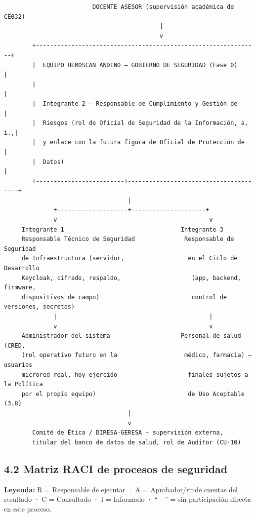 \documentclass[11pt,a4paper]{article}
\begin{document}
\begin{samepage}\begin{verbatim}
                         DOCENTE ASESOR (supervisión académica de CE032)
                                            |
                                            v
        +---------------------------------------------------------------+
        |  EQUIPO HEMOSCAN ANDINO — GOBIERNO DE SEGURIDAD (Fase 0)        |
        |                                                                 |
        |  Integrante 2 — Responsable de Cumplimiento y Gestión de        |
        |  Riesgos (rol de Oficial de Seguridad de la Información, a. i.,|
        |  y enlace con la futura figura de Oficial de Protección de     |
        |  Datos)                                                        |
        +-------------------------+---------------------------------------+
                                   |
              +--------------------+---------------------+
              v                                           v
     Integrante 1                                 Integrante 3
     Responsable Técnico de Seguridad              Responsable de Seguridad
     de Infraestructura (servidor,                  en el Ciclo de Desarrollo
     Keycloak, cifrado, respaldo,                    (app, backend, firmware,
     dispositivos de campo)                          control de versiones, secretos)
              |                                           |
              v                                           v
     Administrador del sistema                    Personal de salud (CRED,
     (rol operativo futuro en la                   médico, farmacia) — usuarios
     microred real, hoy ejercido                    finales sujetos a la Política
     por el propio equipo)                          de Uso Aceptable (3.8)
                                   |
                                   v
        Comité de Ética / DIRESA-GERESA — supervisión externa,
        titular del banco de datos de salud, rol de Auditor (CU-10)
\end{verbatim}\end{samepage}

\subsection{4.2 Matriz RACI de procesos de seguridad}\label{matriz-raci-de-procesos-de-seguridad}

\textbf{Leyenda:} R = Responsable de ejecutar · A = Aprobador/rinde cuentas del resultado · C = Consultado · I = Informado · ``---'' = sin participación directa en este proceso.
\end{document}
